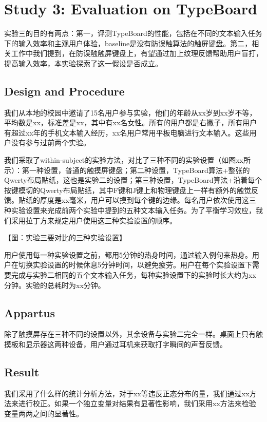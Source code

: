 \section{Study 3: Evaluation on TypeBoard}

实验三的目的有两点：第一，评测TypeBoard的性能，包括在不同的文本输入任务下的输入效率和主观用户体验，baseline是没有防误触算法的触屏键盘。第二，相关工作中我们提到，在防误触触屏键盘上，有望通过加上纹理反馈帮助用户盲打，提高输入效率，本实验探索了这一假设是否成立。

\subsection{Design and Procedure}

我们从本地的校园中邀请了15名用户参与实验，他们的年龄从xx岁到xx岁不等，平均数是xx，标准差是xx，其中有xx名女性。所有的用户都是右撇子，所有用户有超过xx年的手机文本输入经历，xx名用户常用平板电脑进行文本输入。这些用户没有参与过前两个实验。

我们采取了within-subject的实验方法，对比了三种不同的实验设置（如图xx所示）：第一种设置，普通的触摸屏键盘；第二种设置，TypeBoard算法+整张的Qwerty布局贴纸，这也是实验二的设置；第三种设置，TypeBoard算法+沿着每个按键模切的Qwerty布局贴纸，其中F键和J键上和物理键盘上一样有额外的触觉反馈。贴纸的厚度是xx毫米，用户可以摸到每个键的边缘。每名用户依次使用这三种实验设置来完成前两个实验中提到的五种文本输入任务。为了平衡学习效应，我们采用拉丁方来规定用户使用这三种实验设置的顺序。

【图：实验三要对比的三种实验设置】

用户使用每一种实验设置之前，都用5分钟的热身时间，通过输入例句来热身。用户在切换实验设置的时候休息5分钟时间，以避免疲劳。用户在每个实验设置下需要完成与实验二相同的五个文本输入任务，每种实验设置下的实验时长大约为xx分钟。实验的总耗时为xx分钟。

\subsection{Appartus}

除了触摸屏存在三种不同的设置以外，其余设备与实验二完全一样。桌面上只有触摸板和显示器这两种设备，用户通过耳机来获取打字瞬间的声音反馈。

\subsection{Result}

我们采用了什么样的统计分析方法，对于xx等违反正态分布的量，我们通过xx方法来进行校正。如果一个独立变量对结果有显著性影响，我们采用xx方法来检验变量两两之间的显著性。

